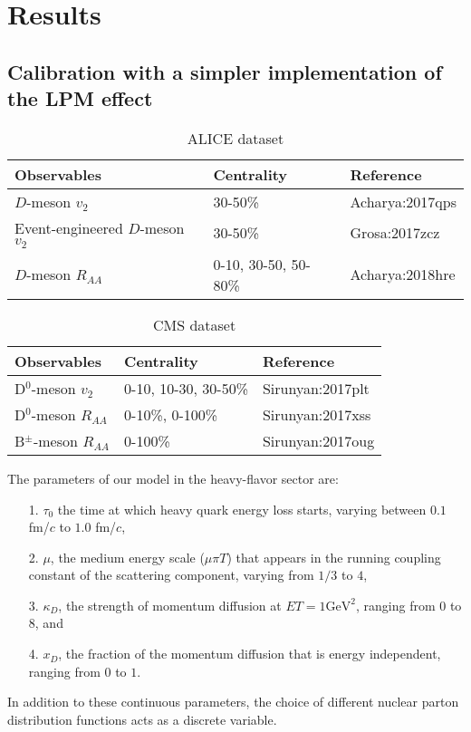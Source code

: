 \chapter{Results}

\section{Calibration with a simpler implementation of the LPM effect}
\begin{center}
\begin{table}[h]
\caption{ALICE dataset}\label{table:ALICE-obs} 
\begin{tabularx}{\columnwidth}{XXX}
\hline 
 Observables & Centrality & Reference\\ 
\hline 
$D$-meson $v_2$ & 30-50\% & {Acharya:2017qps}\\ 
\hline 
Event-engineered $D$-meson $v_2$ & 30-50\% & {Grosa:2017zcz}\\ 
\hline 
$D$-meson $R_{AA}$ & 0-10, 30-50, 50-80\% & {Acharya:2018hre}\\
\hline 
\end{tabularx}
\end{table}
\begin{table}[h]
\caption{CMS dataset}\label{table:CMS-obs} 
\begin{tabularx}{\columnwidth}{XXX}
\hline 
Observables & Centrality & Reference\\ 
\hline 
D${}^0$-meson $v_2$ & 0-10, 10-30, 30-50\% & {Sirunyan:2017plt}\\ 
\hline 
D${}^0$-meson $R_{AA}$ & 0-10\%, 0-100\% & {Sirunyan:2017xss}\\ 
\hline 
B${}^{\pm}$-meson $R_{AA}$ & 0-100\% & {Sirunyan:2017oug}\\ 
\hline 
\end{tabularx}
\end{table}
\end{center}

The parameters of our model in the heavy-flavor sector are:
\begin{itemize}
\item[1.] $\tau_0$ the time at which heavy quark energy loss starts, varying between $0.1$ fm/$c$ to $1.0$ fm/$c$,
\item[2.] $\mu$, the medium energy scale ($\mu\pi T$) that appears in the running coupling constant of the scattering component, varying from $1/3$ to $4$,
\item[3.] $\kappa_D$, the strength of momentum diffusion at $ET = 1 \textrm{GeV}^2$, ranging from $0$ to $8$, and
\item[4.] $x_D$, the fraction of the momentum diffusion that is energy independent, ranging from $0$ to $1$.
\end{itemize}
In addition to these continuous parameters, the choice of different nuclear parton distribution functions acts as a discrete variable.

